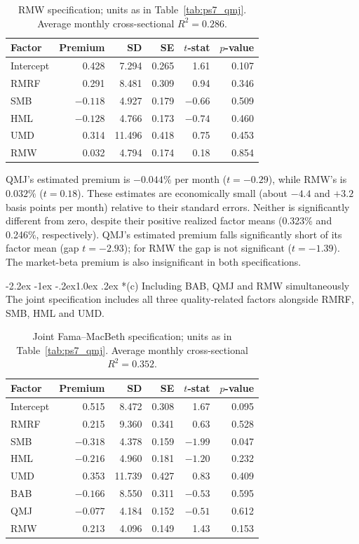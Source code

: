 \documentclass[11pt]{article}
\makeatletter
\renewcommand\subsection{\@startsection{subsection}{2}{0pt}%
  {-2.2ex \@plus -1ex \@minus -.2ex}{1.0ex \@plus .2ex}%
  {\normalfont\bfseries\normalsize\color{psink}}}
\makeatother
\begin{document}
\begin{table}[H]
\centering
\caption{RMW specification; units as in Table~\ref{tab:ps7_qmj}. Average monthly cross-sectional $R^2=0.286$.}
\label{tab:ps7_rmw}
\begin{tabular}{lrrrrr}
\toprule
Factor & Premium & SD & SE & $t$-stat & $p$-value \\
\midrule
Intercept & 0.428 & 7.294 & 0.265 & 1.61 & 0.107 \\
RMRF & 0.291 & 8.481 & 0.309 & 0.94 & 0.346 \\
SMB & $-0.118$ & 4.927 & 0.179 & $-0.66$ & 0.509 \\
HML & $-0.128$ & 4.766 & 0.173 & $-0.74$ & 0.460 \\
UMD & 0.314 & 11.496 & 0.418 & 0.75 & 0.453 \\
RMW & 0.032 & 4.794 & 0.174 & 0.18 & 0.854 \\
\bottomrule
\end{tabular}
\end{table}

\noindent QMJ's estimated premium is $-0.044\%$ per month ($t=-0.29$), while RMW's
is $0.032\%$ ($t=0.18$). These estimates are economically small (about
$-4.4$ and $+3.2$ basis points per month) relative to their standard errors.
Neither is significantly different from zero, despite their positive realized
factor means (0.323\% and 0.246\%, respectively). QMJ's estimated premium
falls significantly short of its factor mean (gap $t=-2.93$); for RMW the gap
is not significant ($t=-1.39$). The market-beta premium is also insignificant
in both specifications.

\subsection*{(c) Including BAB, QMJ and RMW simultaneously}
The joint specification includes all three quality-related factors alongside
RMRF, SMB, HML and UMD.

\begin{table}[H]
\centering
\caption{Joint Fama--MacBeth specification; units as in Table~\ref{tab:ps7_qmj}. Average monthly cross-sectional $R^2=0.352$.}
\label{tab:ps7_joint}
\begin{tabular}{lrrrrr}
\toprule
Factor & Premium & SD & SE & $t$-stat & $p$-value \\
\midrule
Intercept & 0.515 & 8.472 & 0.308 & 1.67 & 0.095 \\
RMRF & 0.215 & 9.360 & 0.341 & 0.63 & 0.528 \\
SMB & $-0.318$ & 4.378 & 0.159 & $-1.99$ & 0.047 \\
HML & $-0.216$ & 4.960 & 0.181 & $-1.20$ & 0.232 \\
UMD & 0.353 & 11.739 & 0.427 & 0.83 & 0.409 \\
BAB & $-0.166$ & 8.550 & 0.311 & $-0.53$ & 0.595 \\
QMJ & $-0.077$ & 4.184 & 0.152 & $-0.51$ & 0.612 \\
RMW & 0.213 & 4.096 & 0.149 & 1.43 & 0.153 \\
\bottomrule
\end{tabular}
\end{table}
\end{document}
